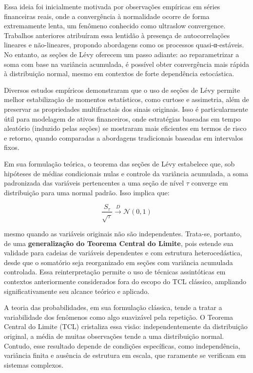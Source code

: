 \documentclass[
  letterpaper,
  DIV=11,
  numbers=noendperiod]{scrartcl}
\begin{document}
Essa ideia foi inicialmente motivada por observações empíricas em séries
financeiras reais, onde a convergência à normalidade ocorre de forma
extremamente lenta, um fenômeno conhecido como ultraslow convergence.
Trabalhos anteriores atribuíram essa lentidão à presença de
autocorrelações lineares e não-lineares, propondo abordagens como os
processos quasi-α-estáveis. No entanto, as seções de Lévy oferecem um
passo adiante: ao reparametrizar a soma com base na variância acumulada,
é possível obter convergência mais rápida à distribuição normal, mesmo
em contextos de forte dependência estocástica.

Diversos estudos empíricos demonstraram que o uso de seções de Lévy
permite melhor estabilização de momentos estatísticos, como curtose e
assimetria, além de preservar as propriedades multifractais dos sinais
originais. Isso é particularmente útil para modelagem de ativos
financeiros, onde estratégias baseadas em tempo aleatório (induzido
pelas seções) se mostraram mais eficientes em termos de risco e retorno,
quando comparadas a abordagens tradicionais baseadas em intervalos
fixos.

Em sua formulação teórica, o teorema das seções de Lévy estabelece que,
sob hipóteses de médias condicionais nulas e controle da variância
acumulada, a soma padronizada das variáveis pertencentes a uma seção de
nível \(\tau\) converge em distribuição para uma normal padrão. Isso
implica que:

\[
\frac{S_\tau}{\sqrt{\tau}} \xrightarrow{D} \mathcal{N}(0, 1)
\]

mesmo quando as variáveis originais não são independentes. Trata-se,
portanto, de uma \textbf{generalização do Teorema Central do Limite},
pois estende sua validade para cadeias de variáveis dependentes e com
estrutura heterocedástica, desde que o somatório seja reorganizado em
seções com variância acumulada controlada. Essa reinterpretação permite
o uso de técnicas assintóticas em contextos anteriormente considerados
fora do escopo do TCL clássico, ampliando significativamente seu alcance
teórico e aplicado.

A teoria das probabilidades, em sua formulação clássica, tende a tratar
a variabilidade dos fenômenos como algo suavizável pela repetição. O
Teorema Central do Limite (TCL) cristaliza essa visão: independentemente
da distribuição original, a média de muitas observações tende a uma
distribuição normal. Contudo, esse resultado depende de condições
específicas, como independência, variância finita e ausência de
estrutura em escala, que raramente se verificam em sistemas complexos.
\end{document}
